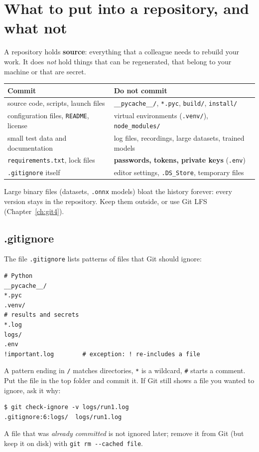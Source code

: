 \section*{What to put into a repository, and what not}
A repository holds \textbf{source}: everything that a colleague needs to rebuild your work. It does \emph{not} hold things that can be regenerated, that belong to your machine or that are secret.
\begin{center}
\renewcommand{\arraystretch}{1.25}
\begin{tabular}{p{6.2cm}p{7.2cm}}
\textbf{Commit} & \textbf{Do not commit}\\ \hline
source code, scripts, launch files & \texttt{\_\_pycache\_\_/}, \texttt{*.pyc}, \texttt{build/}, \texttt{install/}\\
configuration files, \texttt{README}, license & virtual environments (\texttt{.venv/}), \texttt{node\_modules/}\\
small test data and documentation & log files, recordings, large datasets, trained models\\
\texttt{requirements.txt}, lock files & \textbf{passwords, tokens, private keys} (\texttt{.env})\\
\texttt{.gitignore} itself & editor settings, \texttt{.DS\_Store}, temporary files\\
\end{tabular}
\end{center}
Large binary files (datasets, \texttt{.onnx} models) bloat the history forever: every version stays in the repository. Keep them outside, or use Git LFS (Chapter~\ref{ch:git4}).

\subsection*{.gitignore}
The file \texttt{.gitignore} lists patterns of files that Git should ignore:
\begin{verbatim}
# Python
__pycache__/
*.pyc
.venv/
# results and secrets
*.log
logs/
.env
!important.log        # exception: ! re-includes a file
\end{verbatim}
A pattern ending in \texttt{/} matches directories, \texttt{*} is a wildcard, \texttt{\#} starts a comment. Put the file in the top folder and commit it. If Git still shows a file you wanted to ignore, ask it why:
\begin{verbatim}
$ git check-ignore -v logs/run1.log
.gitignore:6:logs/	logs/run1.log
\end{verbatim}
A file that was \emph{already committed} is not ignored later; remove it from Git (but keep it on disk) with \verb!git rm --cached file!.

